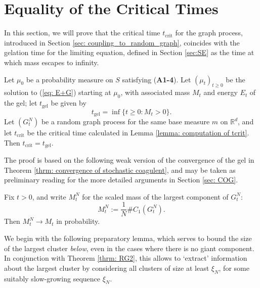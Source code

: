 \section{Equality of the Critical Times}

In this section, we will prove that the critical time $t_\mathrm{crit}$ for the graph process, introduced in Section \ref{sec: coupling_to_random_graph}, coincides with the gelation time for the limiting equation, defined in Section \ref{sec:SE} as the time at which mass escapes to infinity. 
\begin{lemma}\label{lemma: connect critical times} Let $\mu_0$ be a probability measure on $S$ satisfying (\textbf{A1-4}). Let $(\mu_t)_{t\ge 0}$ be the solution to (\ref{eq: E+G}) starting at $\mu_0$, with associated mass $M_t$ and energy $E_t$ of the gel; let $t_\text{gel}$ be given by \begin{equation}
    t_\mathrm{gel}=\inf\{t\ge 0: M_t>0\}.
\end{equation} Let $(G^N_t)$ be a random graph process for the same base measure $m$ on $\mathbb{R}^d$, and let $t_\mathrm{crit}$ be the critical time calculated in Lemma \ref{lemma: computation of tcrit}. Then $t_\mathrm{crit}=t_\mathrm{gel}$. \end{lemma}
The proof is based on the following weak version of the convergence of the gel in Theorem \ref{thrm: convergence of stochastic coagulent}, and may be taken as preliminary reading for the more detailed arguments in Section \ref{sec: COG}. \begin{lemma} \label{lemma: WCOG} Fix $t>0$, and write $M^N_t$ for the scaled mass of the largest component of $G^N_t$: \begin{equation} M^N_t:=\frac{1}{N}\#C_1(G^N_t). \end{equation} Then $M^N_t\rightarrow M_t$ in probability. \end{lemma}  We begin with the following preparatory lemma, which serves to bound the size of the largest cluster \emph{below}, even in the cases where there is no giant component. In conjunction with Theorem \ref{thrm: RG2}, this allows to `extract' information about the largest cluster by considering all clusters of size at least $\xi_N$, for some suitably slow-growing sequence $\xi_N$.
